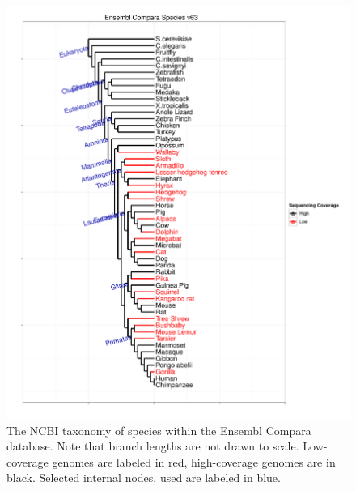 \begin{figure}
\centering
\includegraphics[scale=0.6]{Figs/compara_63_tree.pdf}
\caption{The NCBI taxonomy of species within the Ensembl Compara
  database. Note that branch lengths are not drawn to
  scale. Low-coverage genomes are labeled in red, high-coverage
  genomes are in black. Selected internal nodes, used are labeled in
  blue.}
\label{ncbi_tree}
\end{figure}


